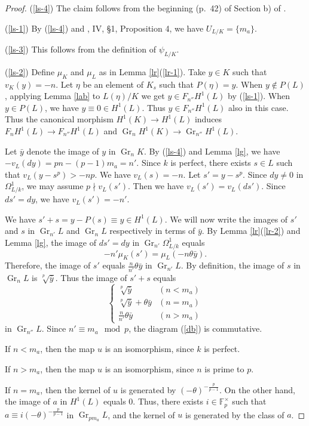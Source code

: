 \documentclass[sn-mathphys-num]{sn-jnl}
\numberwithin{equation}{section}
\newcommand{\Gr}{\operatorname{Gr}}
\theoremstyle{plain}
\theoremstyle{definition}
\begin{document}
      \begin{proof}
(\ref{ls-4}) The claim follows from the beginning (p.\ 42) of Section b) of \cite{Ha}.
        
        (\ref{ls-1}) By (\ref{ls-4}) and \cite{Se}, IV, \S 1, Proposition 4, we have $U_{L/K}=\{m_a\}$.

(\ref{ls-3}) This follows from the definition of $\psi_{L/K}$.
        
        (\ref{ls-2}) Define $\mu_{K}$ and $\mu_{L}$ as in Lemma \ref{lr}(\ref{lr-1}). Take $y\in K$ such that $v_K(y)=-n$. Let $\eta$ be an element of $K_s$ such that $P(\eta)=y$. When $y\notin P(L)$, applying Lemma \ref{lab} to $L(\eta)/K$ we get $y\in F_{n''}H^1(L)$ by (\ref{ls-1}). When $y\in P(L)$, we have $y\equiv 0\in H^1(L)$. Thus $y\in F_{n''}H^1(L)$ also in this case. Thus the canonical morphism $H^1(K)\to H^1(L)$ induces $F_nH^1(L)\to F_{n''}H^1(L)$ and $\Gr_nH^1(K)\to \Gr_{n''}H^1(L)$.

         Let $\bar{y}$ denote the image of $y$ in $\Gr_nK$. By (\ref{ls-4}) and Lemma \ref{lg}, we have $-v_L(dy)=pn-(p-1)m_a=n'$. Since $k$ is perfect, there exists $s\in L$ such that $v_L(y-s^p)>-np$. We have $v_L(s)=-n$. Let ${s'}=y-s^p$. Since $dy\neq 0$ in $\Omega_{L/k}^1$, we may assume $p\nmid v_L({s'})$. Then we have $v_L({s'})=v_L(d{s'})$. Since $d{s'}=dy$, we have $v_L({s'})=-n'$.

        We have ${s'}+s=y-P(s)\equiv y\in H^1(L)$. We will now write the images of ${s'}$ and $s$ in $\Gr_{n'}L$ and $\Gr_nL$ respectively in terms of $\bar{y}$. By Lemma \ref{lr}(\ref{lr-2}) and Lemma \ref{lg}, the image of $d{s'}=dy$ in $\Gr_{n'}\Omega_{L/k}^1$ equals
        \begin{equation}
        -n'\mu_{K}({s'})=\mu_{L}(-n\theta\bar{y}).
        \end{equation}
        Therefore, the image of ${s'}$ equals $\displaystyle{\frac{n}{n'}\theta\bar{y}}$ in $\Gr_{n'}L$. By definition, the image of $s$ in $\Gr_nL$ is $\sqrt[p]{\bar{y}}$.
Thus the image of ${s'}+s$ equals
  \begin{equation}
  \left\{\begin{array}{ll}
        \sqrt[p]{\bar{y}}&(n<m_a)\\
        \sqrt[p]{\bar{y}}+\theta\bar{y}&(n=m_a)\\
        \frac{n}{n'}\theta\bar{y}&(n>m_a)
      \end{array}\right.
  \end{equation}
  in $\Gr_{n''}L$. Since $n'\equiv m_a\mod p$, the diagram (\ref{db}) is commutative.

  If $n<m_a$, then the map $u$ is an isomorphism, since $k$ is perfect.

  If $n>m_a$, then the map $u$ is an isomorphism, since $n$ is prime to $p$.

  If $n=m_a$, then the kernel of $u$ is generated by $(-\theta)^{-\frac{p}{p-1}}$. On the other hand, the image of $a$ in $H^1(L)$ equals 0. Thus, there exists $i\in\mathbb{F}_p^\times$ such that $a\equiv i(-\theta)^{-\frac{p}{p-1}}$ in $\Gr_{pm_a}L$, and the kernel of $u$ is generated by the class of $a$.
\end{proof}
\end{document}
